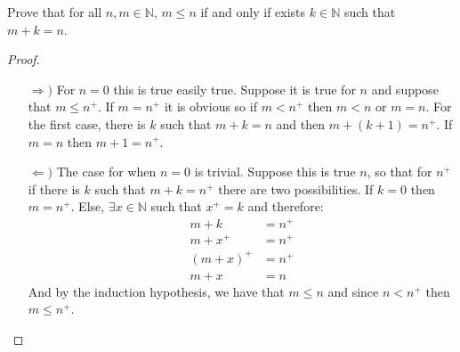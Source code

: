 \documentclass{tufte-handout}
\begin{document}
\begin{problem}
	Prove that for all $n, m \in \mathbb{N}$, $m \le n$ if and only if exists $k \in \mathbb{N}$ such that $m + k = n$.
\end{problem}
\begin{proof}
	\begin{itemize}
		\item[$\Rightarrow)$] For $n = 0$ this is true easily true. Suppose it is true for $n$ and suppose that $m \le n^+$. If $m = n^+$ it is obvious so if $m < n^+$ then $m < n$ or $m = n$. For the first case, there is $k$ such that $m + k = n$ and then $m + (k + 1) = n^+$. If $m = n$ then $m + 1 = n^+$.
		\item[$\Leftarrow)$] The case for when $n = 0$ is trivial. Suppose this is true $n$, so that for $n^+$ if there is $k$ such that $m + k = n^+$ there are two possibilities. If $k = 0$ then $m= n^+$. Else, $\exists x \in \mathbb{N}$ such that $x^+ = k$ and therefore:
		\begin{align*}
			m + k &= n^+\\
			m + x^+ &= n^+\\
			(m + x)^+ &= n^+\\
			m + x &= n
		\end{align*} 
		And by the induction hypothesis, we have that $m \le n$ and since $n < n^+$ then $m \le n^+$.
	\end{itemize}
\end{proof}
\end{document}
